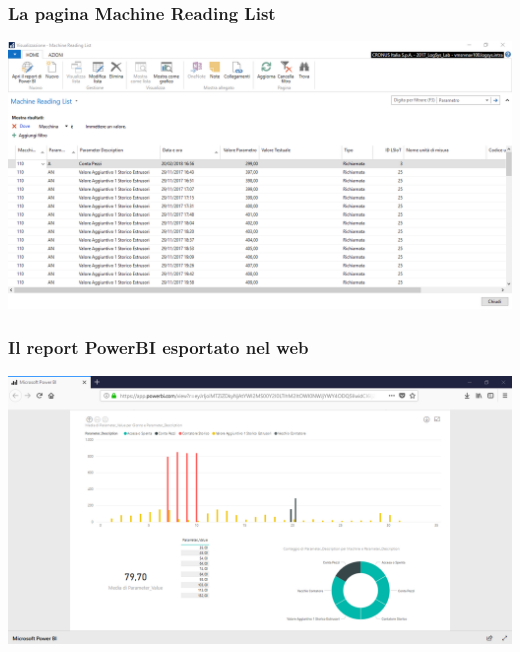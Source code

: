 \documentclass{beamer}
\begin{document}




\begin{frame}
\frametitle{La pagina Machine Reading List}
\includegraphics[width=1\textwidth]{images/MachineReadingList.png}
\end{frame}


\begin{frame}
\frametitle{Il report PowerBI esportato nel web}
\includegraphics[width=1\textwidth]{images/ReportWEB.png}
\end{frame}
\end{document}
